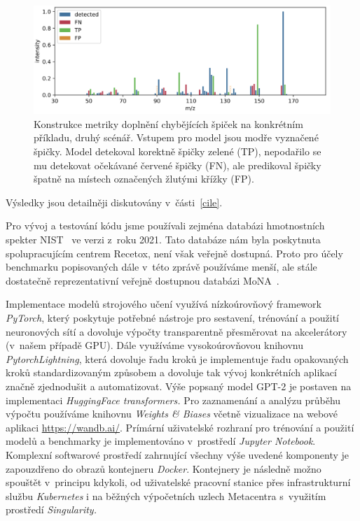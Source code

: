 \documentclass[a4paper,11pt]{article}
\begin{document}
\begin{figure}
\begin{center}
\includegraphics[width=.8\hsize]{metric-wrong}
\end{center}
\caption{Konstrukce metriky doplnění chybějících špiček na konkrétním příkladu, druhý scénář.
Vstupem pro model jsou modře vyznačené špičky. Model detekoval korektně špičky zelené (TP),
nepodařilo se mu detekovat očekávané červené špičky (FN), ale predikoval špičky špatně na
místech označených žlutými křížky (FP).
}
\label{f:metric-wrong}
\end{figure}

Výsledky jsou detailněji diskutovány v~části~\ref{cile}.

Pro vývoj a testování kódu jsme používali zejména databázi hmotnostních spekter
NIST~\cite{nist} ve verzi z~roku 2021.
Tato databáze nám byla poskytnuta spolupracujícím centrem Recetox, není však veřejně dostupná.
Proto pro účely benchmarku popisovaných dále v~této zprávě používáme menší, ale stále dostatečně reprezentativní
veřejně dostupnou databázi MoNA~\cite{mona}.

Implementace modelů strojového učení využívá nízkoúrovňový framework \emph{PyTorch}, který poskytuje
potřebné nástroje pro sestavení, trénování a použití neuronových sítí a dovoluje výpočty transparentně
přesměrovat na akcelerátory (v~našem případě GPU).
Dále využíváme vysokoúrovňovou knihovnu \emph{PytorchLightning}, která dovoluje řadu kroků
je implementuje řadu opakovaných kroků standardizovaným způsobem a dovoluje tak vývoj konkrétních aplikací
značně zjednodušit a automatizovat.
Výše popsaný model GPT-2 je postaven na implementaci \emph{HuggingFace transformers.}
Pro zaznamenání a analýzu průběhu výpočtu používáme knihovnu \emph{Weights \& Biases} včetně vizualizace na webové aplikaci
\url{https://wandb.ai/}.
Prímární uživatelské rozhraní pro trénování a použití modelů a benchmarky je implementováno v~prostředí
\emph{Jupyter Notebook}.
Komplexní softwarové prostředí zahrnující všechny výše uvedené komponenty je zapouzdřeno do
obrazů kontejneru \emph{Docker}.
Kontejnery je následně možno spouštět v~principu kdykoli, od uživatelské pracovní stanice přes
infrastrukturní službu \emph{Kubernetes} i na běžných výpočetních uzlech Metacentra s~využitím 
prostředí \emph{Singularity.} 
\end{document}
